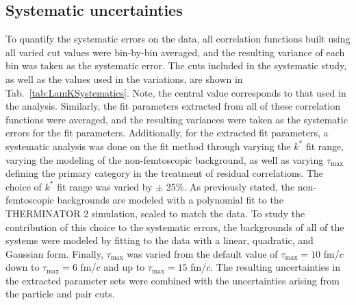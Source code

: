 \documentclass[ALICE,manyauthors]{cernphprep}
\newcommand{\kstar}{$k^{*}$\xspace}
\begin{document}
\subsection{Systematic uncertainties}
\label{SysErrs}

To quantify the systematic errors on the data, all correlation functions built using all varied cut values were bin-by-bin averaged, and the resulting variance of each bin was taken as the systematic error.  
The cuts included in the systematic study, as well as the values used in the variations, are shown in Tab.\ \ref{tab:LamKSystematics}.  
Note, the central value corresponds to that used in the analysis.
Similarly, the fit parameters extracted from all of these correlation functions were averaged, and the resulting variances were taken as the systematic errors for the fit parameters.
Additionally, for the extracted fit parameters, a systematic analysis was done on the fit method through varying the \kstar fit range, varying the modeling of the non-femtoscopic background, as well as varying $\tau_{\mathrm{max}}$ defining the primary category in the treatment of residual correlations.
The choice of \kstar fit range was varied by $\pm$ 25\%. 
As previously stated, the non-femtoscopic backgrounds are modeled with a polynomial fit to the THERMINATOR 2 simulation, scaled to match the data.
To study the contribution of this choice to the systematic errors, the backgrounds of all of the systems were modeled by fitting to the data with a {\color{red}{with a}} linear, quadratic, and Gaussian form.
Finally, $\tau_{\mathrm{max}}$ was varied from the default value of $\tau_{\mathrm{max}} = 10$ fm/$c$ down to $\tau_{\mathrm{max}} = 6$ fm/$c$ and up to $\tau_{\mathrm{max}} = 15$ fm/$c$.
The resulting uncertainties in the extracted parameter sets were combined with the uncertainties arising from the particle and pair cuts.
\end{document}

